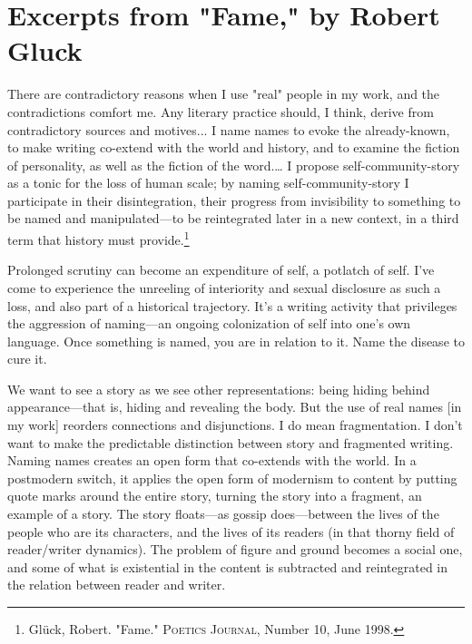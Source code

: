 \documentclass[
]{memoir}
\begin{document}
\hypertarget{excerpts-from-fame-by-robert-gluck}{%
\section*{Excerpts from "Fame," by Robert
Gluck}\label{excerpts-from-fame-by-robert-gluck}}

There are contradictory reasons when I use "real" people in my work, and
the contradictions comfort me. Any literary practice should, I think,
derive from contradictory sources and motives... I name names to evoke
the already-known, to make writing co-extend with the world and history,
and to examine the fiction of personality, as well as the fiction of the
word.\ldots{} I propose self-community-story as a tonic for the loss of
human scale; by naming self-community-story I participate in their
disintegration, their progress from invisibility to something to be
named and manipulated---to be reintegrated later in a new context, in a
third term that history must provide.\footnote{Glück, Robert. "Fame."
  \textsc{Poetics Journal}, Number 10, June 1998.}

Prolonged scrutiny can become an expenditure of self, a potlatch of
self. I've come to experience the unreeling of interiority and sexual
disclosure as such a loss, and also part of a historical trajectory.
It's a writing activity that privileges the aggression of naming---an
ongoing colonization of self into one's own language. Once something is
named, you are in relation to it. Name the disease to cure it.

We want to see a story as we see other representations: being hiding
behind appearance---that is, hiding and revealing the body. But the use
of real names {[}in my work{]} reorders connections and disjunctions. I
do mean fragmentation. I don't want to make the predictable distinction
between story and fragmented writing. Naming names creates an open form
that co-extends with the world. In a postmodern switch, it applies the
open form of modernism to content by putting quote marks around the
entire story, turning the story into a fragment, an example of a story.
The story floats---as gossip does---between the lives of the people who
are its characters, and the lives of its readers (in that thorny field
of reader/writer dynamics). The problem of figure and ground becomes a
social one, and some of what is existential in the content is subtracted
and reintegrated in the relation between reader and writer.
\end{document}
